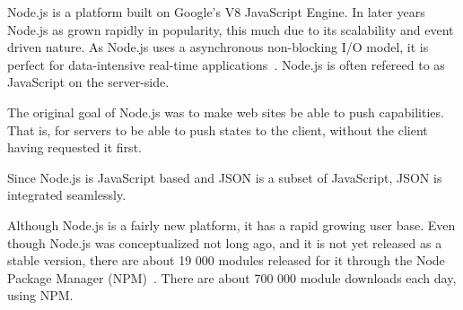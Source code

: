 Node.js is a platform built on Google's V8 JavaScript Engine. In later years Node.js as grown rapidly in popularity, this much due to its scalability and event driven nature. As Node.js uses a asynchronous non-blocking I/O model, it is perfect for data-intensive real-time applications~\citep{site:nodejs}. Node.js is often refereed to as JavaScript on the server-side. 

The original goal of Node.js was to make web sites be able to push capabilities. That is, for servers to be able to push states to the client, without the client having requested it first. 

Since Node.js is JavaScript based and JSON is a subset of JavaScript, JSON is integrated seamlessly. 

Although Node.js is a fairly new platform, it has a rapid growing user base. Even though Node.js was conceptualized not long ago, and it is not yet released as a stable version, there are about 19 000 modules released for it through the Node Package Manager (NPM)~\citep{site:npm}. There are about 700 000 module downloads each day, using NPM. 